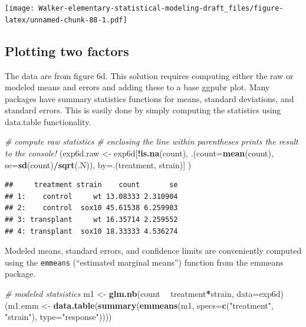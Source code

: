 \documentclass[]{book}
\newenvironment{Shaded}{\begin{snugshade}}{\end{snugshade}}
\newcommand{\CommentTok}[1]{\textcolor[rgb]{0.56,0.35,0.01}{\textit{#1}}}
\newcommand{\DataTypeTok}[1]{\textcolor[rgb]{0.13,0.29,0.53}{#1}}
\newcommand{\KeywordTok}[1]{\textcolor[rgb]{0.13,0.29,0.53}{\textbf{#1}}}
\newcommand{\NormalTok}[1]{#1}
\newcommand{\OperatorTok}[1]{\textcolor[rgb]{0.81,0.36,0.00}{\textbf{#1}}}
\newcommand{\StringTok}[1]{\textcolor[rgb]{0.31,0.60,0.02}{#1}}
\begin{document}
\texttt{[image: Walker-elementary-statistical-modeling-draft\_files/figure-latex/unnamed-chunk-88-1.pdf]}

\hypertarget{plotting-two-factors}{%
\subsection{Plotting two factors}\label{plotting-two-factors}}

The data are from figure 6d. This solution requires computing either the raw or modeled means and errors and adding these to a base ggpubr plot. Many packages have summary statistics functions for means, standard deviations, and standard errors. This is easily done by simply computing the statistics using data.table functionality.

\begin{Shaded}
\begin{Highlighting}[]
\CommentTok{# compute raw statistics}
\CommentTok{# enclosing the line within parentheses prints the result to the console!}
\NormalTok{(exp6d.raw <-}\StringTok{ }\NormalTok{exp6d[}\OperatorTok{!}\KeywordTok{is.na}\NormalTok{(count), .(}\DataTypeTok{count=}\KeywordTok{mean}\NormalTok{(count),}
                       \DataTypeTok{se=}\KeywordTok{sd}\NormalTok{(count)}\OperatorTok{/}\KeywordTok{sqrt}\NormalTok{(.N)),}
                   \DataTypeTok{by=}\NormalTok{.(treatment, strain)]}
\NormalTok{)}
\end{Highlighting}
\end{Shaded}

\begin{verbatim}
##     treatment strain    count       se
## 1:    control     wt 13.08333 2.310904
## 2:    control  sox10 45.61538 6.259903
## 3: transplant     wt 16.35714 2.259552
## 4: transplant  sox10 18.33333 4.536274
\end{verbatim}

Modeled means, standard errors, and confidence limits are conveniently computed using the \texttt{emmeans} (``estimated marginal means'') function from the emmeans package.

\begin{Shaded}
\begin{Highlighting}[]
\CommentTok{# modeled statsistics}
\NormalTok{m1 <-}\StringTok{ }\KeywordTok{glm.nb}\NormalTok{(count }\OperatorTok{~}\StringTok{ }\NormalTok{treatment}\OperatorTok{*}\NormalTok{strain, }\DataTypeTok{data=}\NormalTok{exp6d)}
\NormalTok{(m1.emm <-}\StringTok{ }\KeywordTok{data.table}\NormalTok{(}\KeywordTok{summary}\NormalTok{(}\KeywordTok{emmeans}\NormalTok{(m1, }\DataTypeTok{specs=}\KeywordTok{c}\NormalTok{(}\StringTok{"treatment"}\NormalTok{, }\StringTok{"strain"}\NormalTok{), }\DataTypeTok{type=}\StringTok{"response"}\NormalTok{))))}
\end{Highlighting}
\end{Shaded}
\end{document}
